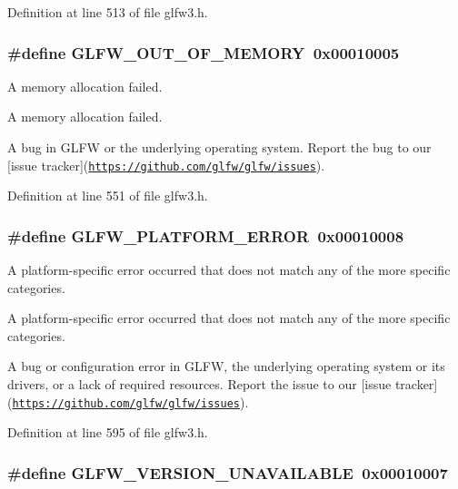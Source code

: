 Definition at line 513 of file glfw3.h.\hypertarget{group__errors_g9023953a2bcb98c2906afd071d21ee7f}{
\subsubsection[GLFW\_\-OUT\_\-OF\_\-MEMORY]{\setlength{\rightskip}{0pt plus 5cm}\#define GLFW\_\-OUT\_\-OF\_\-MEMORY~0x00010005}}
\label{group__errors_g9023953a2bcb98c2906afd071d21ee7f}


A memory allocation failed. 

A memory allocation failed.

A bug in GLFW or the underlying operating system. Report the bug to our \mbox{[}issue tracker\mbox{]}(\href{https://github.com/glfw/glfw/issues}{\tt https://github.com/glfw/glfw/issues}). 

Definition at line 551 of file glfw3.h.\hypertarget{group__errors_gd44162d78100ea5e87cdd38426b8c7a1}{
\subsubsection[GLFW\_\-PLATFORM\_\-ERROR]{\setlength{\rightskip}{0pt plus 5cm}\#define GLFW\_\-PLATFORM\_\-ERROR~0x00010008}}
\label{group__errors_gd44162d78100ea5e87cdd38426b8c7a1}


A platform-specific error occurred that does not match any of the more specific categories. 

A platform-specific error occurred that does not match any of the more specific categories.

A bug or configuration error in GLFW, the underlying operating system or its drivers, or a lack of required resources. Report the issue to our \mbox{[}issue tracker\mbox{]}(\href{https://github.com/glfw/glfw/issues}{\tt https://github.com/glfw/glfw/issues}). 

Definition at line 595 of file glfw3.h.\hypertarget{group__errors_gd16c5565b4a69f9c2a9ac2c0dbc89462}{
\subsubsection[GLFW\_\-VERSION\_\-UNAVAILABLE]{\setlength{\rightskip}{0pt plus 5cm}\#define GLFW\_\-VERSION\_\-UNAVAILABLE~0x00010007}}
\label{group__errors_gd16c5565b4a69f9c2a9ac2c0dbc89462}



